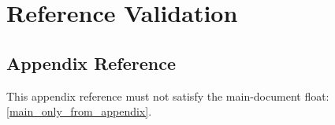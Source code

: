\documentclass[a4paper,12pt]{report}
\begin{document}
\chapter{Reference Validation}
\appendixChapter
\section{Appendix Reference}
This appendix reference must not satisfy the main-document float: \cref{main_only_from_appendix}.
\end{document}
